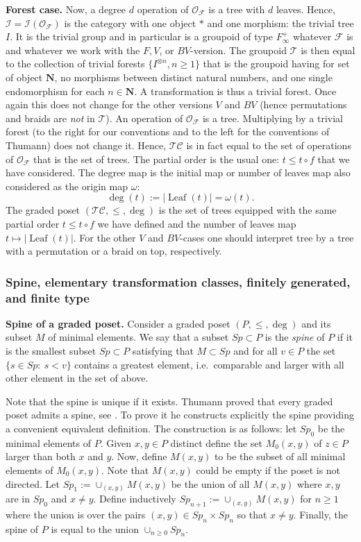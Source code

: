 \documentclass[a4paper, 12pt]{amsart}
\numberwithin{equation}{section}
\theoremstyle{definition}
\newcommand{\cC}{\mathcal C}
\newcommand{\cF}{\mathcal F}
\newcommand{\cI}{\mathcal I}
\DeclareMathOperator{\Leaf}{Leaf}
\newcommand{\N}{\mathbf{N}}
\newcommand{\cO}{\mathcal O}
\newcommand{\ot}{\otimes}
\newcommand{\cT}{\mathcal T}
\begin{document}
{\bf Forest case.}
Now, a degree $d$ operation of $\cO_\cF$ is a tree with $d$ leaves.
Hence, $\cI=\cI(\cO_\cF)$ is the category with one object $*$ and one morphism: the trivial tree $I$. It is the trivial group and in particular is a groupoid of type $F_\infty^+$ whatever $\cF$ is and whatever we work with the $F,V$, or $BV$-version.
The groupoid $\cT$ is then equal to the collection of trivial forests $\{I^{\ot n}, n\geq 1\}$ that is the groupoid having for set of object $\N$, no morphisms between distinct natural numbers, and one single endomorphism for each $n\in \N$.
A transformation is thus a trivial forest.
Once again this does not change for the other versions $V$ and $BV$ (hence permutations and braids are {\it not} in $\cT$).
An operation of $\cO_\cF$ is a tree. Multiplying by a trivial forest (to the right for our conventions and to the left for the conventions of Thumann) does not change it.
Hence, $\cT\cC$ is in fact equal to the set of operations of $\cO_\cF$ that is the set of trees. 
The partial order is the usual one: $t\leq t\circ f$ that we have considered.
The degree map is the initial map or number of leaves map also considered as the origin map $\omega$:
$$\deg(t):=|\Leaf(t)|=\omega(t).$$
The graded poset $(\cT\cC,\leq,\deg)$ is the set of trees equipped with the same partial order $t\leq t\circ f$ we have defined and the number of leaves map $t\mapsto |\Leaf(t)|.$
For the other $V$ and $BV$-cases one should interpret tree by a tree with a permutation or a braid on top, respectively.

\subsubsection{Spine, elementary transformation classes, finitely generated, and finite type}

{\bf Spine of a graded poset.}
Consider a graded poset $(P,\leq,\deg)$ and its subset $M$ of minimal elements.
We say that a subset $Sp\subset P$ is the {\it spine} of $P$ if it is the smallest subset $Sp\subset P$ satisfying that $M\subset Sp$ and for all $v\in P$ the set $\{s\in Sp:\ s<v\}$ contains a greatest element, i.e.~comparable and larger with all other element in the set of above.

Note that the spine is unique if it exists.
Thumann proved that every graded poset admits a spine, see \cite[Section 3.4.1]{Thumann17}.
To prove it he constructs explicitly the spine providing a convenient equivalent definition.
The construction is as follows: let $Sp_0$ be the minimal elements of $P$.
Given $x,y\in P$ distinct define the set $M_0(x,y)$ of $z\in P$ larger than both $x$ and $y$. 
Now, define $M(x,y)$ to be the subset of all minimal elements of $M_0(x,y)$.
Note that $M(x,y)$ could be empty if the poset is not directed.
Let $Sp_1:= \cup_{(x,y)} M(x,y)$ be the union of all $M(x,y)$ where $x,y$ are in $Sp_0$ and $x\neq y$.
Define inductively $Sp_{n+1}:=\cup_{(x,y)} M(x,y)$ for $n\geq 1$ where the union is over the pairs $(x,y)\in Sp_n\times Sp_n$ so that $x\neq y$.
Finally, the spine of $P$ is equal to the union $\cup_{n\geq 0} Sp_n.$
\end{document}
